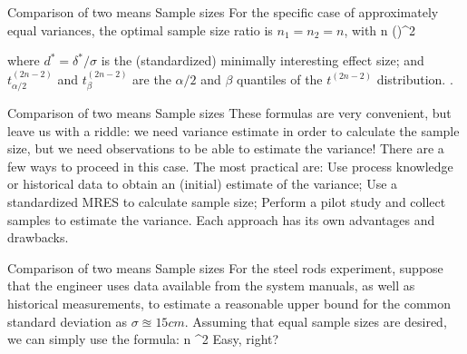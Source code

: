 \documentclass[t]{beamer}
\begin{document}

\begin{ftst}
{Comparison of two means}
{Sample sizes}
For the specific case of approximately equal variances, the optimal sample size ratio is $n_1 = n_2 = n$, with
\beqs
n \left(\right)^2
\eqs
\vhalf

\noindent where $d^* = \delta^*/\sigma$ is the (standardized) minimally interesting effect size; and $t^{(2n-2)}_{\alpha/2}$ and $t^{(2n-2)}_{\beta}$ are the $\alpha/2$ and $\beta$ quantiles of the $t^{(2n-2 )}$ distribution. .

\end{ftst}


\begin{ftst}
{Comparison of two means}
{Sample sizes}
These formulas are very convenient, but leave us with a riddle: we need variance estimate in order to calculate the sample size, but we need observations to be able to estimate the variance!
\vone
There are a few ways to proceed in this case. The most practical are:
\vhalf
\bitems Use process knowledge or historical data to obtain an (initial) estimate of the  variance;
\spitem Use a standardized MRES to calculate sample size;
\spitem Perform a pilot study and collect samples to estimate the variance.
\eitem
\vhalf Each approach has its own advantages and drawbacks.
\end{ftst}


%


\begin{ftst}
{Comparison of two means}
{Sample sizes}
For the steel rods experiment, suppose that the engineer uses data available from the system manuals, as well as historical measurements, to estimate a reasonable upper bound for the common standard deviation as $\sigma \approxeq 15cm$.
\vhalf
Assuming that equal sample sizes are desired, we can simply use the formula:
\vone
\beqs
n ^2
\eqs
\vone\vone\vone
\flushright Easy, right?
\end{ftst}
\end{document}
